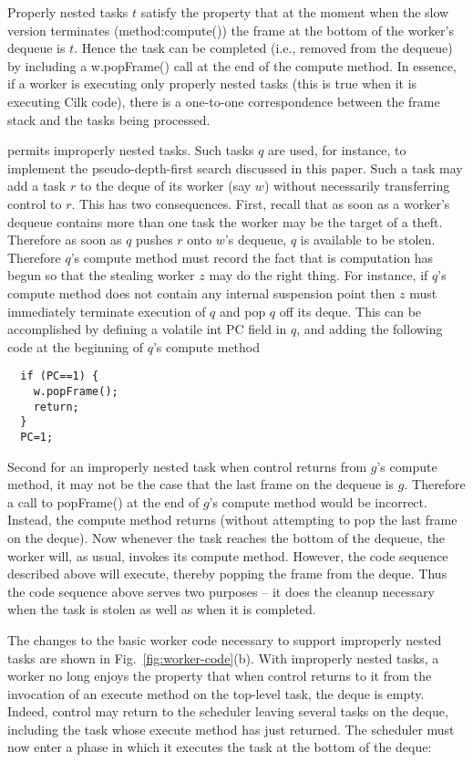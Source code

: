 Properly nested tasks $t$ satisfy the property that at the moment when
the slow version terminates (method:{\java compute()}) the frame at
the bottom of the worker's dequeue is $t$. Hence the task can be
completed (i.e., removed from the dequeue) by including a {\java
w.popFrame()} call at the end of the compute method. In essence, if a
worker is executing only properly nested tasks (this is true when it
is executing Cilk code), there is a one-to-one correspondence between
the frame stack and the tasks being processed.

\Xten{} permits improperly nested tasks. Such tasks $q$ are used, for
instance, to implement the pseudo-depth-first search discussed in this
paper. Such a task may add a task $r$ to the deque of its worker (say $w$)
without necessarily transferring control to $r$. This has two
consequences. First, recall that as soon as a worker's dequeue
contains more than one task the worker may be the target of a
theft. Therefore as soon as $q$ pushes $r$ onto $w$'s dequeue, $q$ is
available to be stolen.  Therefore $q$'s compute method must record the
fact that is computation has begun so that the stealing worker $z$ may
do the right thing. For instance, if $q$'s compute method does not
contain any internal suspension point then $z$ must immediately
terminate execution of $q$ and pop $q$ off its deque. This can be
accomplished by defining a volatile int PC field in $q$, and adding the
following code at the beginning of $q$'s compute method

{\scriptsize
\begin{verbatim}
  if (PC==1) {
    w.popFrame();
    return;
  }
  PC=1;
\end{verbatim}
}

Second for an improperly nested task when control returns from $g$'s
compute method, it may not be the case that the last frame on the
dequeue is $g$. Therefore a call to {\java popFrame()} at the end of
$g$'s compute method would be incorrect. Instead, the compute method
returns (without attempting to pop the last frame on the deque). Now
whenever the task reaches the bottom of the dequeue, the worker will,
as usual, invokes its compute method. However, the code sequence
described above will execute, thereby popping the frame from the
deque. Thus the code sequence above serves two purposes -- it does the
cleanup necessary when the task is stolen as well as when it is
completed.

The changes to the basic worker code necessary to support improperly
nested tasks are shown in Fig.~\ref{fig:worker-code}(b). With
improperly nested tasks, a worker no long enjoys the property that
when control returns to it from the invocation of an execute method on
the top-level task, the deque is empty. Indeed, control may return to
the scheduler leaving several tasks on the deque, including the task
whose execute method has just returned. The scheduler must now enter a
phase in which it executes the task at the bottom of the deque:

